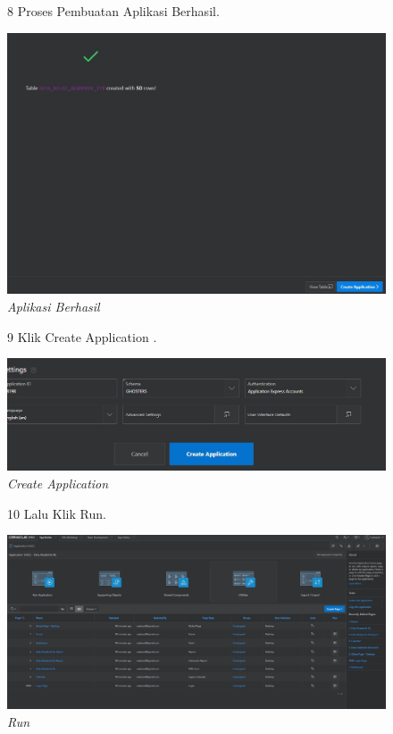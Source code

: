 \begin{enumerate}
\begin{figure}
\item[8] Proses Pembuatan Aplikasi Berhasil.

    \begin{center}
\includegraphics[scale=0.2]{figures/8.jpg}
    \caption{\textit{Aplikasi Berhasil}}
        \end{center}
\label{gambar}
\end{figure}

\begin{figure}
\item[9] Klik Create Application .

    \begin{center}
\includegraphics[scale=0.2]{figures/9.jpg}
    \caption{\textit{Create Application}}
        \end{center}
\label{gambar}
\end{figure}

\begin{figure}
\item[10] Lalu Klik Run.
    \begin{center}
\includegraphics[scale=0.2]{figures/10.jpg}
    \caption{\textit{Run}}
        \end{center}
\label{gambar}
\end{figure}


\end{enumerate}
